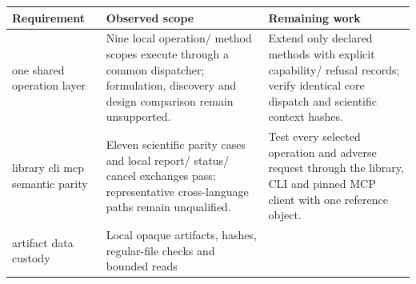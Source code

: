 \documentclass[
  10pt,
]{article}
\begin{document}
\begin{longtable}[]{@{}>{\raggedright\arraybackslash}p{}>{\raggedright\arraybackslash}p{}>{\raggedright\arraybackslash}p{}@{}}
\toprule
\begin{minipage}[b]{\linewidth}\raggedright
Requirement\strut
\end{minipage} & \begin{minipage}[b]{\linewidth}\raggedright
Observed scope\strut
\end{minipage} & \begin{minipage}[b]{\linewidth}\raggedright
Remaining work\strut
\end{minipage}\tabularnewline
\midrule
\endhead
\begin{minipage}[t]{\linewidth}\raggedright
one shared operation layer\strut
\end{minipage} & \begin{minipage}[t]{\linewidth}\raggedright
Nine local operation/ method scopes execute through a common dispatcher;
formulation, discovery and design comparison remain unsupported.\strut
\end{minipage} & \begin{minipage}[t]{\linewidth}\raggedright
Extend only declared methods with explicit capability/ refusal records;
verify identical core dispatch and scientific context hashes.\strut
\end{minipage}\tabularnewline
\begin{minipage}[t]{\linewidth}\raggedright
library cli mcp semantic parity\strut
\end{minipage} & \begin{minipage}[t]{\linewidth}\raggedright
Eleven scientific parity cases and local report/ status/ cancel
exchanges pass; representative cross-language paths remain
unqualified.\strut
\end{minipage} & \begin{minipage}[t]{\linewidth}\raggedright
Test every selected operation and adverse request through the library,
CLI and pinned MCP client with one reference object.\strut
\end{minipage}\tabularnewline
\begin{minipage}[t]{\linewidth}\raggedright
artifact data custody\strut
\end{minipage} & \begin{minipage}[t]{\linewidth}\raggedright
Local opaque artifacts, hashes, regular-file checks and bounded reads

\end{minipage}
\end{longtable}
\end{document}
